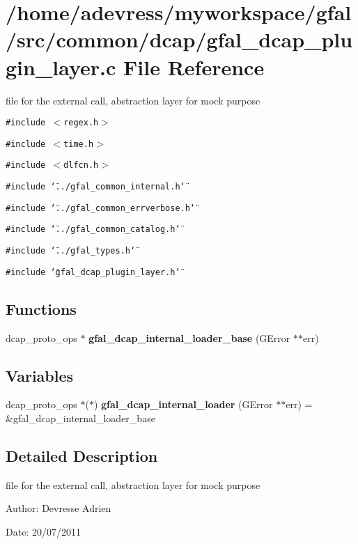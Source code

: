 \section{/home/adevress/myworkspace/gfal/src/common/dcap/gfal\_\-dcap\_\-plugin\_\-layer.c File Reference}
\label{gfal__dcap__plugin__layer_8c}
file for the external call, abstraction layer for mock purpose 

{\tt \#include $<$regex.h$>$}\par
{\tt \#include $<$time.h$>$}\par
{\tt \#include $<$dlfcn.h$>$}\par
{\tt \#include \char`\"{}../gfal\_\-common\_\-internal.h\char`\"{}}\par
{\tt \#include \char`\"{}../gfal\_\-common\_\-errverbose.h\char`\"{}}\par
{\tt \#include \char`\"{}../gfal\_\-common\_\-catalog.h\char`\"{}}\par
{\tt \#include \char`\"{}../gfal\_\-types.h\char`\"{}}\par
{\tt \#include \char`\"{}gfal\_\-dcap\_\-plugin\_\-layer.h\char`\"{}}\par
\subsection*{Functions}
\begin{CompactItemize}
\item 
dcap\_\-proto\_\-ops $\ast$ \textbf{gfal\_\-dcap\_\-internal\_\-loader\_\-base} (GError $\ast$$\ast$err)\label{gfal__dcap__plugin__layer_8c_611c0baecaaebfbde36bb483636b2d46}

\end{CompactItemize}
\subsection*{Variables}
\begin{CompactItemize}
\item 
dcap\_\-proto\_\-ops $\ast$($\ast$) \textbf{gfal\_\-dcap\_\-internal\_\-loader} (GError $\ast$$\ast$err) = \&gfal\_\-dcap\_\-internal\_\-loader\_\-base\label{gfal__dcap__plugin__layer_8c_613ae4b8bc8b68f6578a1451f436cc4f}

\end{CompactItemize}


\subsection{Detailed Description}
file for the external call, abstraction layer for mock purpose 

\begin{Desc}
\item[Author:]Devresse Adrien \end{Desc}
\begin{Desc}
\item[Date:]20/07/2011 \end{Desc}
